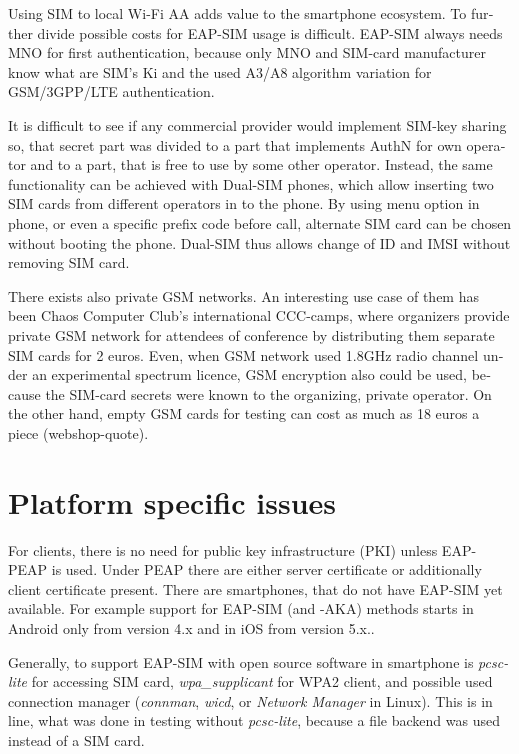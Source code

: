 \documentclass[12pt,a4paper,english]{tutthesis}
\begin{document}
\begin{otherlanguage}{english}
Using SIM to local Wi-Fi AA adds value to the smartphone ecosystem.
To further divide possible costs for EAP-SIM usage
is difficult.
EAP-SIM always needs MNO for first authentication,
because only MNO and SIM-card manufacturer know 
what are SIM's Ki and the used A3/A8 algorithm variation
for GSM/3GPP/LTE authentication.

It is difficult to see if any commercial provider would implement
SIM-key sharing so, that secret part was divided to a part that
implements AuthN for own operator and to a part, that is free to use by
some other operator.  Instead, the same functionality can be achieved with
Dual-SIM phones, which allow inserting two SIM cards from different
operators in to the phone. By using menu option in phone, or even a
specific prefix code before call, alternate SIM card can be chosen
without booting the phone.
Dual-SIM thus allows change of ID and IMSI without removing SIM card.

There exists also private GSM networks. An interesting use case
of them  has been Chaos Computer Club's international 
CCC-camps\cite{ccc}, where organizers 
provide private GSM network for attendees of conference
by distributing them separate SIM cards for 2 euros.  Even, when GSM
network used 1.8GHz radio channel under an experimental spectrum
licence,  GSM encryption also could be used, because the SIM-card secrets were known
to the organizing, private operator.
On the other hand, empty GSM cards for testing can cost as much as 
18 euros a piece (webshop-quote\cite{smartjac-testsim}).


\section{Platform specific issues}
\label{sec-6-3}

For clients, there is no need for public key infrastructure (PKI) 
unless EAP-PEAP is used. Under PEAP there are either server
certificate or additionally client certificate present.
There are smartphones, that do not have EAP-SIM yet available.
For example support for
EAP-SIM (and -AKA) methods starts in Android only from version 4.x and in
iOS from version 5.x.\cite{sim-support}.


Generally, to support EAP-SIM  with open source software in 
smartphone is \emph{pcsc-lite} for accessing SIM card, \emph{wpa\_supplicant} for
WPA2 client, and possible used connection manager (\emph{connman},
\emph{wicd}, or \emph{Network Manager} in Linux). This is in line, what was done in testing without \emph{pcsc-lite},
because a file backend was used instead of a SIM card.






\end{otherlanguage}
\end{document}
